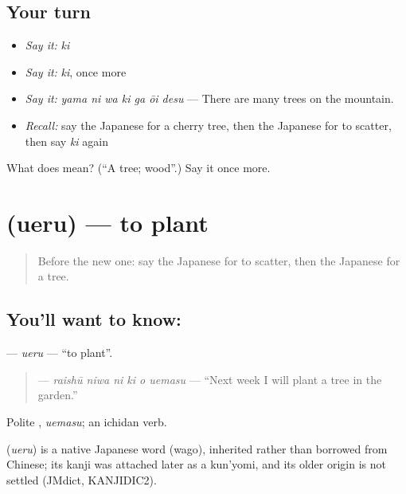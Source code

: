 \subsection*{Your turn}
\begin{itemize}
\raggedright
  \item \emph{Say it:} \emph{ki}
  \item \emph{Say it:} \emph{ki}, once more
  \item \emph{Say it:} \emph{yama ni wa ki ga ōi desu} — There are many trees on the mountain.
  \item \emph{Recall:} say the Japanese for a cherry tree, then the Japanese for to scatter, then say \emph{ki} again
\end{itemize}

\begin{tcolorbox}[breakable,colback=teal!4,colframe=teal!35!black,title={Before you move on}]
What does  mean? (\textquotedblleft{}A tree; wood\textquotedblright{}.) Say it once more.
\end{tcolorbox}
\section[\texorpdfstring{\ja{うえる} (ueru)}{うえる (ueru)}]{ (ueru) — to plant}

\label{lesson:JA-C210-ueru}



\begin{quote}
Before the new one: say the Japanese for to scatter, then the Japanese for a tree.
\end{quote}

\subsection*{You'll want to know: }
\textbf{} — \emph{ueru} — \textquotedblleft{}to plant\textquotedblright{}.

\begin{quote}
\textbf{   } — \emph{raishū niwa ni ki o uemasu} — \textquotedblleft{}Next week I will plant a tree in the garden.\textquotedblright{}
\end{quote}

Polite \textbf{}, \emph{uemasu}; an ichidan verb.

\begin{cousinweb}
\textbf{} (\emph{ueru}) is a native Japanese word (wago), inherited rather than borrowed from Chinese; its kanji was attached later as a kun'yomi, and its older origin is not settled (JMdict, KANJIDIC2).
\end{cousinweb}

